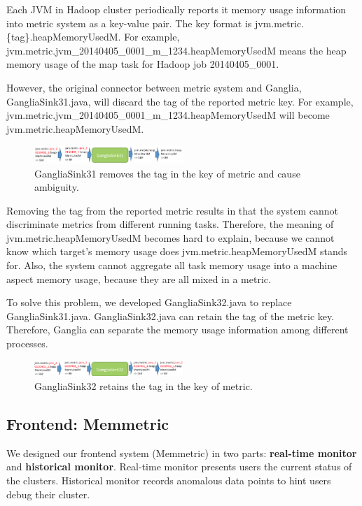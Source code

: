 Each JVM in Hadoop cluster periodically reports it memory usage information into metric system as a key-value pair. The key format is jvm.metric.\{tag\}.heapMemoryUsedM. For example, jvm.metric.jvm\_20140405\_0001\_m\_1234.heapMemoryUsedM means the heap memory usage of the map task for Hadoop job 20140405\_0001. 


However, the original connector between metric system and Ganglia, GangliaSink31.java, will discard the tag of the reported metric key. For example, jvm.metric.jvm\_20140405\_0001\_m\_1234.heapMemoryUsedM will become jvm.metric.heapMemoryUsedM. 

\begin{figure}[h!]
  \caption{GangliaSink31 removes the tag in the key of metric and cause ambiguity.}
  \centering
    \includegraphics[width=0.5\textwidth]{image/ganglia31_flow.png}
\end{figure}

Removing the tag from the reported metric results in that the system cannot discriminate metrics from different running tasks. Therefore, the meaning of jvm.metric.heapMemoryUsedM becomes hard to explain, because we cannot know which target's memory usage does  jvm.metric.heapMemoryUsedM stands for. Also, the system cannot aggregate all task memory usage into a machine aspect memory usage, because they are all mixed in a metric. 

To solve this problem, we developed GangliaSink32.java to replace GangliaSink31.java. GangliaSink32.java can retain the tag of the metric key. Therefore, Ganglia can separate the memory usage information among different processes. 

\begin{figure}[h!]
  \caption{GangliaSink32 retains the tag in the key of metric.}
  \centering
    \includegraphics[width=0.5\textwidth]{image/ganglia32_flow.png}
\end{figure}

\subsection{Frontend: Memmetric}
We designed our frontend system (Memmetric) in two parts: \textbf{real-time monitor} and \textbf{historical monitor}. Real-time monitor  presents users the current status of the clusters. Historical monitor records anomalous data points to hint users debug their cluster.


